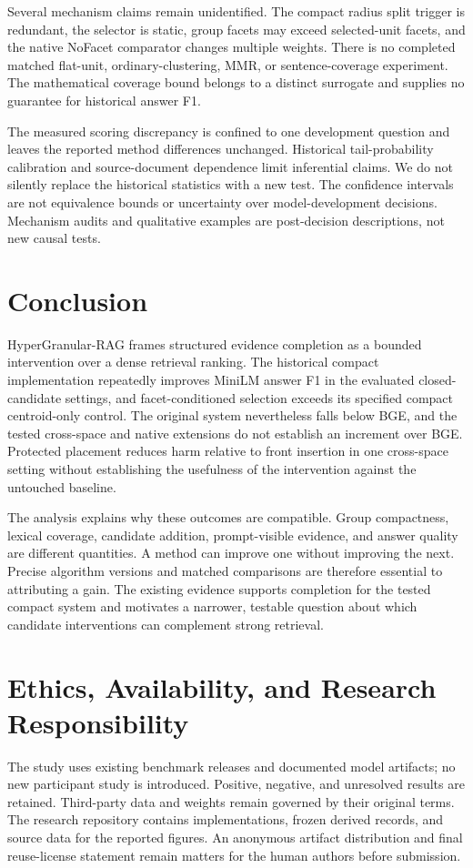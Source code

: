\documentclass[11pt,a4paper]{article}
\newcommand{\hgrag}{HyperGranular-RAG\xspace}
\begin{document}
Several mechanism claims remain unidentified. The compact radius split
trigger is redundant, the selector is static, group facets may exceed
selected-unit facets, and the native NoFacet comparator changes multiple
weights. There is no completed matched flat-unit, ordinary-clustering,
MMR, or sentence-coverage experiment. The mathematical coverage bound
belongs to a distinct surrogate and supplies no guarantee for historical
answer F1.

The measured scoring discrepancy is confined to one development question
and leaves the reported method differences unchanged. Historical
tail-probability calibration and source-document
dependence limit inferential claims. We do not silently replace the
historical statistics with a new test. The confidence intervals are not
equivalence bounds or uncertainty over model-development decisions.
Mechanism audits and qualitative examples are post-decision descriptions,
not new causal tests.

\section{Conclusion}
\hgrag frames structured evidence completion as a bounded intervention over
a dense retrieval ranking. The historical compact implementation repeatedly
improves MiniLM answer F1 in the evaluated closed-candidate settings, and
facet-conditioned selection exceeds its specified compact centroid-only
control. The original system nevertheless falls below BGE, and the tested
cross-space and native extensions do not establish an increment over BGE.
Protected placement reduces harm relative to front insertion in one
cross-space setting without establishing the usefulness of the intervention
against the untouched baseline.

The analysis explains why these outcomes are compatible. Group compactness,
lexical coverage, candidate addition, prompt-visible evidence, and answer
quality are different quantities. A method can improve one without
improving the next. Precise algorithm versions and matched comparisons are
therefore essential to attributing a gain. The existing evidence supports
completion for the tested compact system and motivates a narrower,
testable question about which candidate interventions can complement strong
retrieval.

\section*{Ethics, Availability, and Research Responsibility}
The study uses existing benchmark releases and documented model artifacts;
no new participant study is introduced. Positive, negative, and unresolved
results are retained. Third-party data and weights remain governed by their
original terms. The research repository contains implementations, frozen
derived records, and source data for the reported figures. An anonymous
artifact distribution and final reuse-license statement remain matters for
the human authors before submission.
\end{document}
